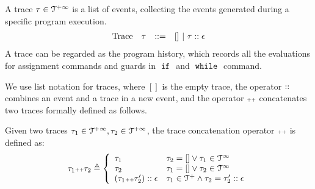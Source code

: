 %
A trace $\mathtt{\tau} \in \mathcal{T}^{+\infty}$ is a list of events, 
collecting the events generated during a specific program execution. 
\[
\begin{array}{llll}
\mbox{Trace} & \mathtt{\tau}
& ::= & [] ~|~ \mathtt{\tau} :: \mathtt{\epsilon} 
\end{array}
\]
A trace can be regarded as the program history, 
which records all the evaluations for assignment commands and guards in $\;\mathtt{if}\;$ and $\;\mathtt{while}\;$ command.
\\

We use list notation for traces, where $[]$ is the empty trace, the operator ${\small ::}$ combines an event and a trace in a new event, 
and the operator ${\scriptscriptstyle ++}$ concatenates two traces formally defined as follows. 

\begin{defn}
  \label{def:trace_concate}
Given two traces $\mathtt{\tau}_1 \in \mathcal{T}^{+\infty}, \mathtt{\tau}_2 \in \mathcal{T}^{+\infty}$, the trace concatenation operator 
${\scriptscriptstyle ++}$ is defined as:
\[
\trace_1 \tracecat \trace_2 \triangleq
\left\{
\begin{array}{ll} 
  \trace_1 & \trace_2 = [] \lor \trace_1 \in \inftdom \\
  \trace_2 & \trace_1 = [] \lor \trace_2 \in \inftdom \\
  (\trace_1   \tracecat \trace_2'):: \event & \trace_1 \in \ftdom \land \trace_2 = \trace_2' :: \event
\end{array}
\right.
\]
\end{defn}

